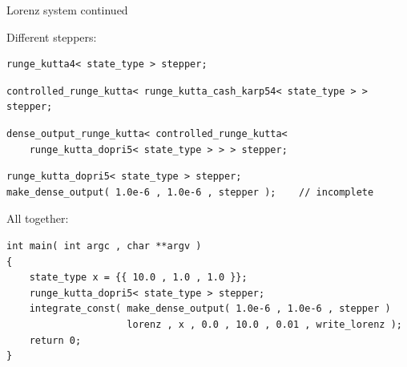 \documentclass{beamer}
\newcommand{\rem}[1]{}
\begin{document}
\begin{frame}[fragile]{Lorenz system continued}

  Different steppers:

  \begin{lstlisting}
runge_kutta4< state_type > stepper;
  \end{lstlisting}

  \pause
  
  \begin{lstlisting}
controlled_runge_kutta< runge_kutta_cash_karp54< state_type > > stepper;
  \end{lstlisting}

  \pause

  \begin{lstlisting}
dense_output_runge_kutta< controlled_runge_kutta<
    runge_kutta_dopri5< state_type > > > stepper;
  \end{lstlisting}

  \pause

  \begin{lstlisting}
runge_kutta_dopri5< state_type > stepper;
make_dense_output( 1.0e-6 , 1.0e-6 , stepper );    // incomplete
  \end{lstlisting}

  \pause

  All together:

  \begin{lstlisting}
int main( int argc , char **argv )
{
    state_type x = {{ 10.0 , 1.0 , 1.0 }};
    runge_kutta_dopri5< state_type > stepper;
    integrate_const( make_dense_output( 1.0e-6 , 1.0e-6 , stepper )
                     lorenz , x , 0.0 , 10.0 , 0.01 , write_lorenz );
    return 0;
}
  \end{lstlisting}



  
\end{frame}

\rem{
\frame{
  \frametitle{Side note: Templates}

  \begin{itemize}
  \item Programming paradigm: Generic programming
  \item Provide a mechanism that classes and functions work on arbitrary types
  \item Static (compile-time) polymorphism
  \item Good performance -- Compiler can optimize
  \item No virtual functions and runtime-polymorphy in odeint
  \item Concepts -- Description of requirements on the used types and classes
  \item Disadvantage: Long compilation time and memory consumption of the compiler
  \end{itemize}
}
}
\end{document}
